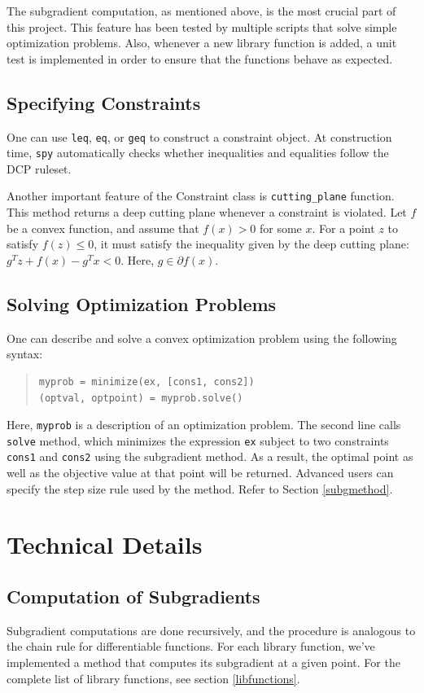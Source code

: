 \documentclass[12pt]{article}
\begin{document}
The subgradient computation, as mentioned above, is the most crucial part of this project. This feature has been tested by multiple scripts that solve simple optimization problems. Also, whenever a new library function is added, a unit test is implemented in order to ensure that the functions behave as expected.

\subsection{Specifying Constraints}
One can use \verb'leq', \verb'eq', or \verb'geq' to construct a constraint
object. At construction time, \verb'spy' automatically checks whether inequalities
and equalities follow the DCP ruleset.

Another important feature of the Constraint class is \verb'cutting_plane'
function. This method returns a deep cutting plane whenever a constraint is
violated. Let $f$ be a convex function, and assume that $f(x) > 0$ for some $x$. For a point $z$ to satisfy $f(z) \le 0$, it must satisfy the inequality given by the deep cutting plane: $g^T z + f(x)-g^T x<0$. Here, $g \in \partial f(x)$.

\subsection{Solving Optimization Problems}
One can describe and solve a convex optimization problem using the following syntax:

\begin{quote}
\begin{verbatim}
myprob = minimize(ex, [cons1, cons2])
(optval, optpoint) = myprob.solve()
\end{verbatim}
\end{quote}

\noindent Here, \verb'myprob' is a description of an optimization problem. The second line calls \verb'solve' method, which minimizes the expression \verb'ex' subject to two constraints \verb'cons1' and \verb'cons2' using the subgradient method. As a result,
the optimal point as well as the objective value at that point will be
returned. Advanced users can specify the step size rule used by the method. Refer to Section \ref{subgmethod}.

\section{Technical Details}

\subsection{Computation of Subgradients}
Subgradient computations are done recursively, and the procedure is
analogous to the chain rule for differentiable functions. 
For each library function, we've implemented a method that computes 
its subgradient at a given point. For the complete list of library functions, see section \ref{libfunctions}.
\end{document}
